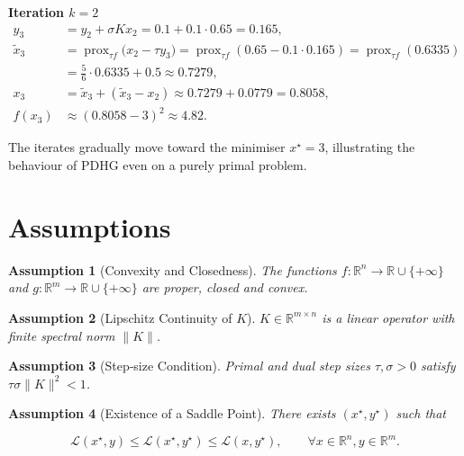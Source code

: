 \documentclass{article}
\newtheorem{assumption}{Assumption}
\newcommand{\prox}{\operatorname{prox}}
\begin{document}
\noindent\textbf{Iteration $k=2$}
\begin{align*}
y_{3}&=y_{2}+ \sigma K x_{2}=0.1+0.1\cdot0.65=0.165,\\
\tilde x_{3}&=\prox_{\tau f}\!\bigl(x_{2}-\tau y_{3}\bigr)
           =\prox_{\tau f}(0.65-0.1\cdot0.165)=\prox_{\tau f}(0.6335)\\
           &=\frac{5}{6}\cdot0.6335+0.5\approx0.7279,\\
x_{3}&=\tilde x_{3}+(\tilde x_{3}-x_{2})\approx0.7279+0.0779=0.8058,\\
f(x_{3})&\approx(0.8058-3)^{2}\approx4.82.
\end{align*}

The iterates gradually move toward the minimiser $x^{\star}=3$, illustrating the behaviour of PDHG even on a purely primal problem.

\newpage
\section*{Assumptions}
\begin{assumption}[Convexity and Closedness]\label{ass:convex}
The functions $f:\mathbb R^{n}\to\mathbb R\cup\{+\infty\}$ and $g:\mathbb R^{m}\to\mathbb R\cup\{+\infty\}$ are proper, closed and convex.
\end{assumption}
\begin{assumption}[Lipschitz Continuity of $K$]\label{ass:K}
$K\in\mathbb R^{m\times n}$ is a linear operator with finite spectral norm $\|K\|$.
\end{assumption}
\begin{assumption}[Step‑size Condition]\label{ass:steps}
Primal and dual step sizes $\tau,\sigma>0$ satisfy $\tau\sigma\|K\|^{2}<1$.
\end{assumption}
\begin{assumption}[Existence of a Saddle Point]\label{ass:saddle}
There exists $(x^{\star},y^{\star})$ such that  

\[
\mathcal L(x^{\star},y)\le \mathcal L(x^{\star},y^{\star})\le \mathcal L(x,y^{\star}),\qquad\forall x\in\mathbb R^{n},y\in\mathbb R^{m}.
\tag{5}
\]
\end{assumption}
\end{document}
